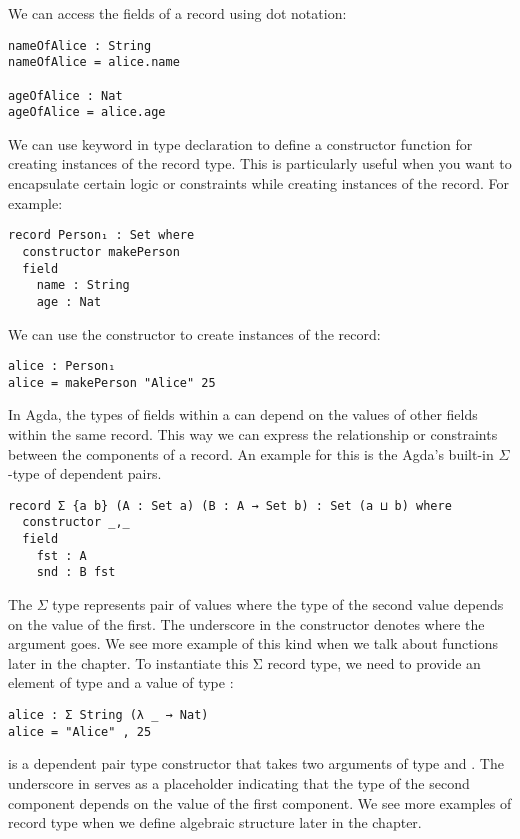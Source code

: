 We can access the fields of a record using dot notation:
\begin{verbatim}
nameOfAlice : String
nameOfAlice = alice.name

ageOfAlice : Nat
ageOfAlice = alice.age
\end{verbatim}

We can use  keyword in  type declaration to
define a constructor function for creating instances of the record type. This is
particularly useful when you want to encapsulate certain logic or constraints
while creating instances of the record. For example:

\begin{verbatim}
record Person₁ : Set where
  constructor makePerson
  field
    name : String
    age : Nat
\end{verbatim}

We can use the constructor  to create instances of the 
record:

\begin{verbatim}
alice : Person₁
alice = makePerson "Alice" 25
\end{verbatim}

In Agda, the types of fields within a  can depend on the values
of other fields within the same record. This way we can express the relationship
or constraints between the components of a record. An example for this is the
Agda's built-in $\Sigma$-type of dependent pairs.

\begin{verbatim}
record Σ {a b} (A : Set a) (B : A → Set b) : Set (a ⊔ b) where
  constructor _,_
  field
    fst : A
    snd : B fst
\end{verbatim}

The $\Sigma$ type represents pair of values where the type of the second value
depends on the value of the first. The underscore in the constructor denotes
where the argument goes. We see more example of this kind when we talk about
functions later in the chapter. To instantiate this Σ record type, we need to
provide an element of type  and a value of type :

\begin{verbatim}
alice : Σ String (λ _ → Nat)
alice = "Alice" , 25
\end{verbatim}

 is a dependent pair type constructor that takes two arguments of type
 and . The underscore in 
serves as a placeholder indicating that the type of the second component depends
on the value of the first component. We see more examples of record type when we
define algebraic structure later in the chapter. 

